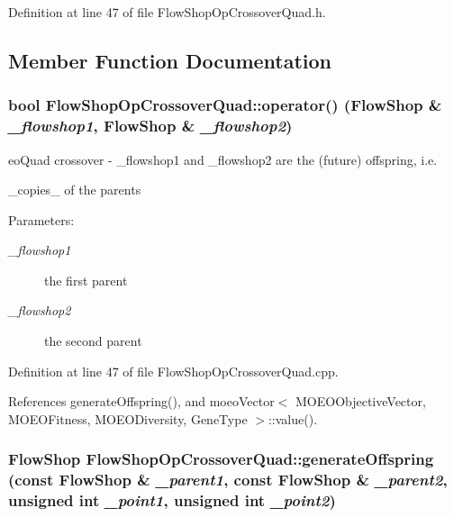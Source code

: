 Definition at line 47 of file Flow\-Shop\-Op\-Crossover\-Quad.h.

\subsection{Member Function Documentation}
\subsubsection{\setlength{\rightskip}{0pt plus 5cm}bool Flow\-Shop\-Op\-Crossover\-Quad::operator() (\bf{Flow\-Shop} \& {\em \_\-flowshop1}, \bf{Flow\-Shop} \& {\em \_\-flowshop2})}\label{classFlowShopOpCrossoverQuad_92f70807bea24d3c233af580e2c55e3a}


eo\-Quad crossover - \_\-flowshop1 and \_\-flowshop2 are the (future) offspring, i.e. 

\_\-copies\_\- of the parents \begin{Desc}
\item[Parameters:]
\begin{description}
\item[{\em \_\-flowshop1}]the first parent \item[{\em \_\-flowshop2}]the second parent \end{description}
\end{Desc}


Definition at line 47 of file Flow\-Shop\-Op\-Crossover\-Quad.cpp.

References generate\-Offspring(), and moeo\-Vector$<$ MOEOObjective\-Vector, MOEOFitness, MOEODiversity, Gene\-Type $>$::value().
\subsubsection{\setlength{\rightskip}{0pt plus 5cm}\bf{Flow\-Shop} Flow\-Shop\-Op\-Crossover\-Quad::generate\-Offspring (const \bf{Flow\-Shop} \& {\em \_\-parent1}, const \bf{Flow\-Shop} \& {\em \_\-parent2}, unsigned int {\em \_\-point1}, unsigned int {\em \_\-point2})\hspace{0.3cm}{\tt  [private]}}\label{classFlowShopOpCrossoverQuad_cbc2f344a0a29861900f4846597564c3}


